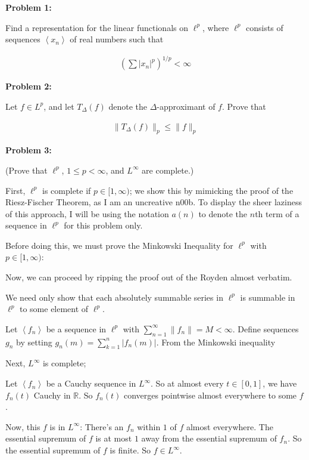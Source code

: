 \documentclass[a4paper,12pt]{article}
\newcommand{\tab}{\hspace{4mm}} %
\newcommand{\shunt}{\vspace{20mm}}
\newcommand{\absval}[1]{\left\lvert #1 \right\rvert}
\newcommand{\norm}[1]{\|#1\|}
\newcommand{\anbrack}[1]{\left\langle #1 \right\rangle}
\newcommand{\De}{\Delta}
\newcommand{\R}{\mathbb{R}}
\begin{document}
{\bf Problem 1:} 

Find a representation for the linear functionals on $\ell^p$, where $\ell^p$ consists of sequences $\anbrack{x_n}$ of real numbers such that

\begin{align*}
(\sum\absval{x_n}^p)^{1/p}<\infty
\end{align*}

\shunt

{\bf Problem 2:} 

Let $f \in L^p$, and let $T_\De(f)$ denote the $\De$-approximant of $f$. Prove that

\begin{align*}
\norm{T_\De(f)}_p \leq \norm{f}_p
\end{align*}

\shunt

{\bf Problem 3:} 

(Prove that $\ell^p$, $1\leq p < \infty$, and $L^\infty$ are complete.)

First, $\ell^p$ is complete if $p \in [1, \infty)$; we show this by mimicking the proof of the Riesz-Fischer Theorem, as I am an uncreative n00b. To display the sheer laziness of this approach, I will be using the notation $a(n)$ to denote the $n$th term of a sequence in $\ell^p$ for this problem only.

Before doing this, we must prove the Minkowski Inequality for $\ell^p$ with $p \in [1,\infty)$:

\tab %

Now, we can proceed by ripping the proof out of the Royden almost verbatim.

\tab We need only show that each absolutely summable series in $\ell^p$ is summable in $\ell^p$ to some element of $\ell^p$.

\tab Let $\anbrack{f_n}$ be a sequence in $\ell^p$ with $\sum\limits_{n=1}^\infty \norm{f_n} = M < \infty$. Define sequences $g_n$ by setting $g_n(m) = \sum\limits_{k=1}^n \absval{f_n(m)}$. From the Minkowski inequality %

Next, $L^\infty$ is complete;

\tab Let $\anbrack{f_n}$ be a Cauchy sequence in $L^\infty$. So at almost every $t \in [0,1]$, we have $f_n(t)$ Cauchy in $\R$. So $f_n(t)$ converges pointwise almost everywhere to some $f$. %

\tab Now, this $f$ is in $L^\infty$: There's an $f_n$ within $1$ of $f$ almost everywhere. The essential supremum of $f$ is at most $1$ away from the essential supremum of $f_n$. So the essential supremum of $f$ is finite. So $f \in L^\infty$.
\end{document}
